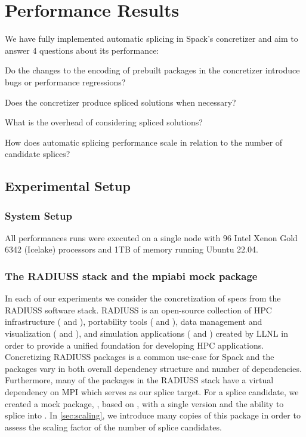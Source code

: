 \section{Performance Results}
\EncodingPerfPlot{}
\SplicePerfPlot{}
\ScalingPerfPlot{}
We have fully implemented automatic splicing in Spack's concretizer and aim to
answer 4 questions about its performance:
\begin{questions}
\item Do the changes to the encoding of prebuilt packages in the concretizer
  introduce bugs or performance regressions? \label{rq:dev-regressions}
\item Does the concretizer produce spliced solutions when
  necessary? \label{rq:splice-correctness}
\item What is the overhead of considering spliced
  solutions? \label{rq:splice-performance}
\item How does automatic splicing performance scale in relation to the number of
  candidate splices? \label{rq:splice-scaling}
\end{questions}

\subsection{Experimental Setup}
\subsubsection{System Setup}
All performances runs were executed on a single node with 96 Intel Xenon Gold
6342 (Icelake) processors and 1TB of memory running Ubuntu 22.04.

\subsubsection{The RADIUSS stack and the mpiabi mock package}
In each of our experiments we consider the concretization of specs from the
RADIUSS software stack. RADIUSS is an open-source collection of HPC
infrastructure (\eg{}  and ), portability tools
(\eg{}  and ), data management and visualization
(\eg{}  and ), and simulation applications
(\eg{}  and ) created by LLNL in order to
provide a unified foundation for developing HPC applications.  Concretizing
RADIUSS packages is a common use-case for Spack and the packages vary in both
overall dependency structure and number of dependencies. Furthermore, many of
the packages in the RADIUSS stack have a virtual dependency on MPI which serves
as our splice target. For a splice candidate, we created a mock package,
, based on , with a single version and the
ability to splice into . In \cref{sec:scaling}, we introduce
many copies of this package in order to assess the scaling factor of the number
of splice candidates.

